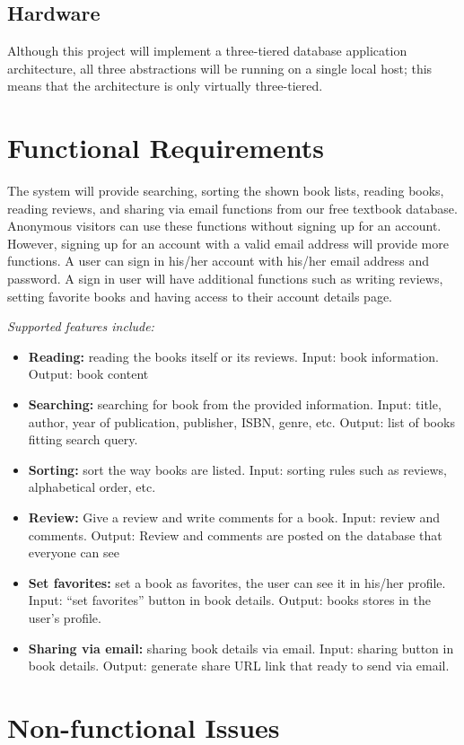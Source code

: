 \documentclass[titlepage]{article}
\begin{document}
	\subsection{Hardware}
		Although this project will implement a three-tiered database application architecture, all three abstractions will be running on a single local host; this means that the architecture is only virtually three-tiered. 
	
	\section{Functional Requirements}
	The system will provide searching, sorting the shown book lists, reading books, reading reviews, and sharing via email functions from our free textbook database. 
	Anonymous visitors can use these functions without signing up for an account. However, signing up for an account with a valid email address will provide more functions. 
	A user can sign in his/her account with his/her email address and password. A sign in user will have additional functions such as writing reviews, setting favorite books and having access to their account details page. 
	

\textit{Supported features include:}
	\begin{itemize}
\item	\textbf{Reading:} reading the books itself or its reviews. Input: book information. Output: book content


\item	\textbf{Searching:} searching for book from the provided information. Input: title, author, year of publication, publisher, ISBN, genre, etc. Output: list of books fitting search query.
	
	
\item	\textbf{Sorting:} sort the way books are listed. Input: sorting rules such as reviews, alphabetical order, etc.
	
	
\item	\textbf{Review:} Give a review and write comments for a book. Input: review and comments. Output: Review and comments are posted on the database that everyone can see
	
	
\item	\textbf{Set favorites:} set a book as favorites, the user can see it in his/her profile. Input: “set favorites” button in book details. Output: books stores in the user’s profile.
	
	
\item	\textbf{Sharing via email:} sharing book details via email. Input: sharing button in book details. Output: generate share URL link that ready to send via email. 

	\end{itemize}



	\section{Non-functional Issues}
\end{document}
